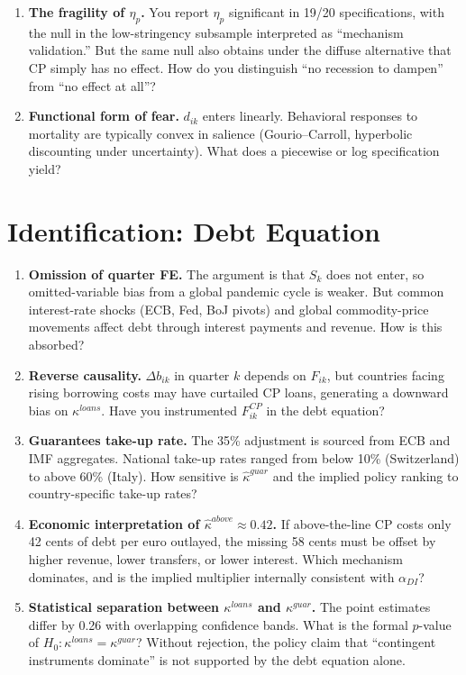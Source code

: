\documentclass[11pt,a4paper]{article}
\begin{document}
\begin{enumerate}
\item \textbf{The fragility of $\eta_p$.} You report $\eta_p$ significant in 19/20 specifications, with the null in the low-stringency subsample interpreted as ``mechanism validation.'' But the same null also obtains under the diffuse alternative that CP simply has no effect. How do you distinguish ``no recession to dampen'' from ``no effect at all''?

\item \textbf{Functional form of fear.} $d_{ik}$ enters linearly. Behavioral responses to mortality are typically convex in salience (Gourio--Carroll, hyperbolic discounting under uncertainty). What does a piecewise or log specification yield?
\end{enumerate}

\section{Identification: Debt Equation}

\begin{enumerate}
\item \textbf{Omission of quarter FE.} The argument is that $S_k$ does not enter, so omitted-variable bias from a global pandemic cycle is weaker. But common interest-rate shocks (ECB, Fed, BoJ pivots) and global commodity-price movements affect debt through interest payments and revenue. How is this absorbed?

\item \textbf{Reverse causality.} $\Delta b_{ik}$ in quarter $k$ depends on $F_{ik}$, but countries facing rising borrowing costs may have curtailed CP loans, generating a downward bias on $\kappa^{loans}$. Have you instrumented $F^{CP}_{ik}$ in the debt equation?

\item \textbf{Guarantees take-up rate.} The 35\% adjustment is sourced from ECB and IMF aggregates. National take-up rates ranged from below 10\% (Switzerland) to above 60\% (Italy). How sensitive is $\hat\kappa^{guar}$ and the implied policy ranking to country-specific take-up rates?

\item \textbf{Economic interpretation of $\hat\kappa^{above} \approx 0.42$.} If above-the-line CP costs only 42 cents of debt per euro outlayed, the missing 58 cents must be offset by higher revenue, lower transfers, or lower interest. Which mechanism dominates, and is the implied multiplier internally consistent with $\alpha_{DI}$?

\item \textbf{Statistical separation between $\kappa^{loans}$ and $\kappa^{guar}$.} The point estimates differ by 0.26 with overlapping confidence bands. What is the formal $p$-value of $H_0: \kappa^{loans} = \kappa^{guar}$? Without rejection, the policy claim that ``contingent instruments dominate'' is not supported by the debt equation alone.
\end{enumerate}
\end{document}
